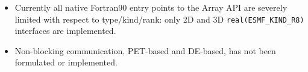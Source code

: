 
\begin{itemize}
\item Currently all native Fortran90 entry points to the Array API are severely limited with respect to type/kind/rank: only 2D and 3D 
{\tt real(ESMF\_KIND\_R8)} interfaces are implemented.
\item Non-blocking communication, PET-based and DE-based, has not been formulated or implemented.
\end{itemize}
